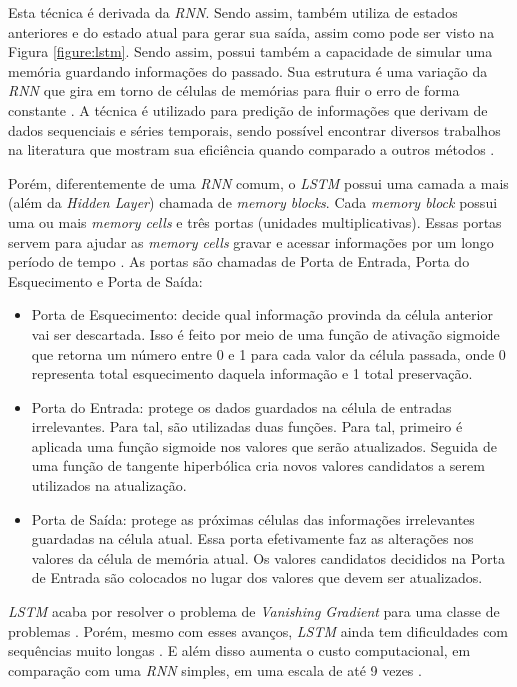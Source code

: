 Esta técnica é derivada da \textit{\acrshort{RNN}}. Sendo assim, também utiliza de estados anteriores e do estado atual para gerar sua saída, assim como pode ser visto na Figura \ref{figure:lstm}. Sendo assim, possui também a capacidade de simular uma memória guardando informações do passado. Sua estrutura é uma variação da \textit{\acrshort{RNN}} que gira em torno de células de memórias para fluir o erro de forma constante \cite{doi:10.1162/neco.1997.9.8.1735}. A técnica é utilizado para predição de informações que derivam de dados sequenciais e séries temporais, sendo possível encontrar diversos trabalhos na literatura que mostram sua eficiência quando comparado a outros métodos \cite{alex2012}.

Porém, diferentemente de uma \textit{\acrshort{RNN}} comum, o \textit{\acrshort{LSTM}} possui uma camada a mais (além da \textit{Hidden Layer}) chamada de \textit{memory blocks}. Cada \textit{memory block} possui uma ou mais \textit{memory cells} e três portas (unidades multiplicativas). Essas portas servem para ajudar as \textit{memory cells} gravar e acessar informações por um longo período de tempo \cite{alex2012}. As portas são chamadas de Porta de Entrada, Porta do Esquecimento e Porta de Saída:

\begin{itemize}
  \item Porta de Esquecimento: decide qual informação provinda da célula anterior vai ser descartada. Isso é feito por meio de uma função de ativação sigmoide que retorna um número entre 0 e 1 para cada valor da célula passada, onde 0 representa total esquecimento daquela informação e 1 total preservação.
  
  \item Porta do Entrada: protege os dados guardados na célula de entradas irrelevantes. Para tal, são utilizadas duas funções. Para tal, primeiro é aplicada uma função sigmoide nos valores que serão atualizados. Seguida de uma função de tangente hiperbólica cria novos valores candidatos a serem utilizados na atualização.
  
  \item Porta de Saída: protege as próximas células das informações irrelevantes guardadas na célula atual. Essa porta efetivamente faz as alterações nos valores da célula de memória atual. Os valores candidatos decididos na Porta de Entrada são colocados no lugar dos valores que devem ser atualizados.
\end{itemize}

\textit{\acrshort{LSTM}} acaba por resolver o problema de \textit{Vanishing Gradient} para uma classe de problemas \cite{doi:10.1162/neco.1997.9.8.1735}. Porém, mesmo com esses avanços, \textit{\acrshort{LSTM}} ainda tem dificuldades com sequências muito longas \cite{alex2012}. E além disso aumenta o custo computacional, em comparação com uma \textit{\acrshort{RNN}} simples, em uma escala de até 9 vezes \cite{doi:10.1162/neco.1997.9.8.1735}.

